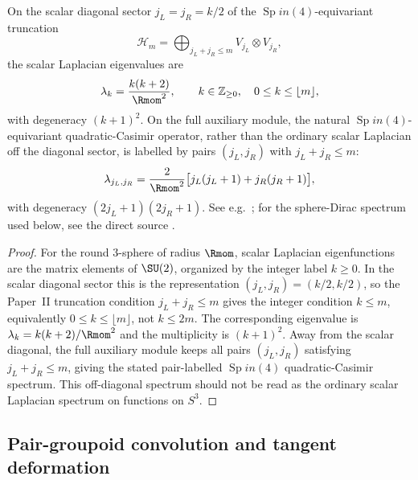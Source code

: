 \documentclass[11pt,a4paper]{article}
\begin{document}
\begin{proposition}
\label{p3:pro:scalar-diagonal}
On the scalar diagonal sector \(j_L=j_R=k/2\) of the \(\operatorname{Sp}in(4)\)-equivariant truncation
\[
\mathcal H_m=\bigoplus_{j_L+j_R\le m}V_{j_L}\otimes V_{j_R},
\]
the scalar Laplacian eigenvalues are
\begin{equation}
\lambda_k = \frac{k(k+2)}{\Rmom^2}, \qquad k\in\mathbb Z_{\ge0},\quad 0\le k\le\lfloor m\rfloor,
\end{equation}
with degeneracy \((k+1)^2\).  On the full auxiliary module, the natural \(\operatorname{Sp}in(4)\)-equivariant quadratic-Casimir operator, rather than the ordinary scalar Laplacian off the diagonal sector, is labelled by pairs
\((j_L,j_R)\) with \(j_L+j_R\le m\):
\begin{equation}
\lambda_{j_L,j_R}
=
\frac{2}{\Rmom^2}\bigl[j_L(j_L+1)+j_R(j_R+1)\bigr],
\end{equation}
with degeneracy \((2j_L+1)(2j_R+1)\).
See e.g.\ \cite{Camporesi1991}; for the sphere-Dirac spectrum used below,
see the direct source \cite{CamporesiHiguchi1996}.
\end{proposition}
\begin{proof}
For the round 3-sphere of radius \(\Rmom\), scalar Laplacian eigenfunctions are the matrix
elements of \(\SU(2)\), organized by the integer label \(k\ge 0\).  In the scalar diagonal
sector this is the representation \((j_L,j_R)=(k/2,k/2)\), so the Paper~II truncation
condition \(j_L+j_R\le m\) gives the integer condition \(k\le m\), equivalently \(0\le k\le\lfloor m\rfloor\), not \(k\le 2m\).  The corresponding eigenvalue
is \(\lambda_k=k(k+2)/\Rmom^2\) and the multiplicity is \((k+1)^2\).  Away from the scalar
diagonal, the full auxiliary module keeps all pairs \((j_L,j_R)\) satisfying \(j_L+j_R\le m\), giving
the stated pair-labelled \(\operatorname{Sp}in(4)\) quadratic-Casimir spectrum.  This off-diagonal spectrum should not be read as the ordinary scalar Laplacian spectrum on functions on \(S^3\).
\end{proof}


\subsection{Pair-groupoid convolution and tangent deformation}
\label{p3b:app:pair-groupoid-analysis}
\end{document}
